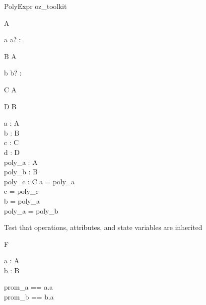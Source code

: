 \begin{zsection}
  \SECTION PolyExpr \parents oz\_toolkit
\end{zsection}

\begin{class}{A}
  \begin{op}{a}
    a? : \nat
  \end{op}
\end{class}

\begin{class}{B}
  \inherits A
  \begin{op}{b}
    b? : \nat
  \end{op}
\end{class}

\begin{class}{C}
  \inherits A
\end{class}

\begin{class}{D}
  \inherits B
\end{class}

\begin{axdef}
  a : A\\
  b : B\\
  c : C\\
  d : D\\
  poly\_a : \poly A\\
  poly\_b : \poly B\\
  poly\_c : \poly C
\where
  a = poly\_a\\
  c = poly\_c\\
  b = poly\_a\\
  
  poly\_a = poly\_b\\
\end{axdef}


Test that operations, attributes, and state variables are inherited
\begin{class}{F}
  \begin{state}
    a : \poly A\\
    b : B\\
  \end{state}
  prom\_a == a.a\\
  prom\_b == b.a\\
\end{class}
